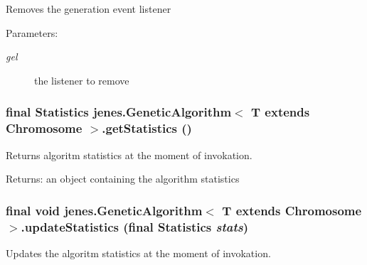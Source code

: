 Removes the generation event listener 

\begin{Desc}
\item[Parameters:]
\begin{description}
\item[{\em gel}]the listener to remove \end{description}
\end{Desc}
\hypertarget{classjenes_1_1_genetic_algorithm_3_01_t_01extends_01_chromosome_01_4_484fcdba7cf2e4aa4a6ec1c0006e2193}{
\subsubsection[getStatistics]{\setlength{\rightskip}{0pt plus 5cm}final Statistics jenes.GeneticAlgorithm$<$ T extends Chromosome $>$.getStatistics ()}}
\label{classjenes_1_1_genetic_algorithm_3_01_t_01extends_01_chromosome_01_4_484fcdba7cf2e4aa4a6ec1c0006e2193}


Returns algoritm statistics at the moment of invokation. 

\begin{Desc}
\item[Returns:]an object containing the algorithm statistics \end{Desc}
\hypertarget{classjenes_1_1_genetic_algorithm_3_01_t_01extends_01_chromosome_01_4_8a4f4965c968047c55a8b56240267a4f}{
\subsubsection[updateStatistics]{\setlength{\rightskip}{0pt plus 5cm}final void jenes.GeneticAlgorithm$<$ T extends Chromosome $>$.updateStatistics (final Statistics {\em stats})}}
\label{classjenes_1_1_genetic_algorithm_3_01_t_01extends_01_chromosome_01_4_8a4f4965c968047c55a8b56240267a4f}


Updates the algoritm statistics at the moment of invokation. 


